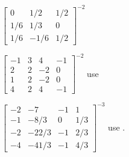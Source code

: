 \begin{exercise}
\begin{Parts}
\item \(\begin{bmatrix} 0&1/2&1/2
\\1/6&1/3&0
\\1/6&-1/6&1/2 \end{bmatrix}^{-2}\)

\item \(\begin{bmatrix} -1&3&4&-1
\\2&2&-2&0
\\1&2&-2&0
\\4&2&4&-1 \end{bmatrix}^{-2}\) use \script
{}

\begin{OmitV1}
\item \(\begin{bmatrix} -2&-7&-1&1
\\-1&-8/3&0&1/3
\\-2&-22/3&-1&2/3
\\-4&-41/3&-1&4/3 \end{bmatrix}^{-3}\) use \script.
\end{OmitV1}

\end{Parts}
\end{exercise}




